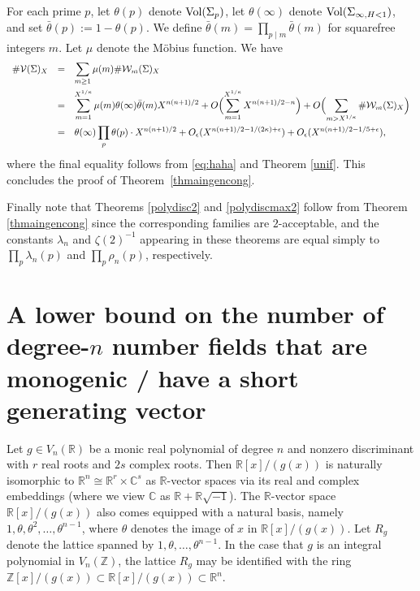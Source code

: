 \documentclass[11pt]{article}
\def\Z{{\mathbb Z}}
\def\Vol{{\rm Vol}}
\def\R{{\mathbb R}}
\def\C{{\mathcal C}}
\def\W{{\mathcal W}}
\def\V{{\mathcal V}}
\def\Vmn{{V_n}}
\def\Z{{\mathbb Z}}
\def\C{{\mathbb C}}
\def\max{{\rm max}}
\begin{document}
For each prime $p$, let $\theta(p)$ denote
$\Vol(\Sigma_p)$, let $\theta(\infty)$ denote
$\Vol(\Sigma_{\infty,H<1})$, and set
$\bar{\theta}(p):=1-\theta(p)$. We define
$\bar{\theta}(m)=\prod_{p\mid m}\bar{\theta}(m)$ for squarefree
integers $m$.   Let $\mu$ denote the
M\"obius function. We have
\begin{equation}\label{eqth1}
\begin{array}{rcl}
\#\V(\Sigma)_X&=&\displaystyle\sum_{m\geq 1}\mu(m)\#\W_m(\Sigma)_X\\[.2in]
&=&\displaystyle\sum_{m=1}^{X^{1/\kappa}}\mu(m)\theta(\infty)\bar{\theta}(m)X^{n(n+1)/2}
+O\Bigl(\sum_{m=1}^{X^{1/\kappa}}X^{n(n+1)/2-n}\Bigr)
+O\Bigl(\sum_{m>X^{1/\kappa}}\#\W_{m}(\Sigma)_X\Bigr)\\[.2in]
&=&\displaystyle\theta(\infty)\prod_p\theta(p)\cdot X^{n(n+1)/2}+O_\epsilon(X^{n(n+1)/2-1/(2\kappa)+\epsilon})+O_\epsilon(X^{n(n+1)/2-1/5+\epsilon}),
\end{array}
\end{equation}
where the final equality follows from \eqref{eq:haha} and Theorem \ref{unif}.
This concludes the proof of Theorem~\ref{thmaingencong}.



Finally note that Theorems \ref{polydisc2} and \ref{polydiscmax2}
follow from Theorem \ref{thmaingencong} since the corresponding
families are $2$-acceptable, and the constants $\lambda_n$ and
$\zeta(2)^{-1}$ appearing in these theorems are equal simply to
$\prod_p\lambda_n(p)$ and $\prod_p\rho_n(p)$, respectively.

\section{A lower bound on the number of degree-$n$ number fields that are monogenic / have a short generating vector}\label{latticearg}

Let $g\in \Vmn(\R)$ be a monic real polynomial of degree $n$ and
nonzero discriminant with $r$ real roots and $2s$ complex roots.  Then
$\R[x]/(g(x))$ is naturally isomorphic to $\R^n\cong \R^r\times \C^s$
as $\R$-vector spaces via its real and complex embeddings (where we
view $\C$ as $\R+\R\sqrt{-1}$).  The $\R$-vector space $\R[x]/(g(x))$
also comes equipped with a natural basis, namely
$1,\theta,\theta^2,\ldots,\theta^{n-1}$, where $\theta$ denotes the
image of $x$ in $\R[x]/(g(x))$. Let $R_g$ denote the lattice spanned
by $1,\theta,\ldots,\theta^{n-1}.$ In the case that $g$ is an integral
polynomial in $\Vmn(\Z)$, the lattice $R_g$ may be identified with the
ring $\Z[x]/(g(x))\subset\R[x]/(g(x))\subset \R^n$.
\end{document}
